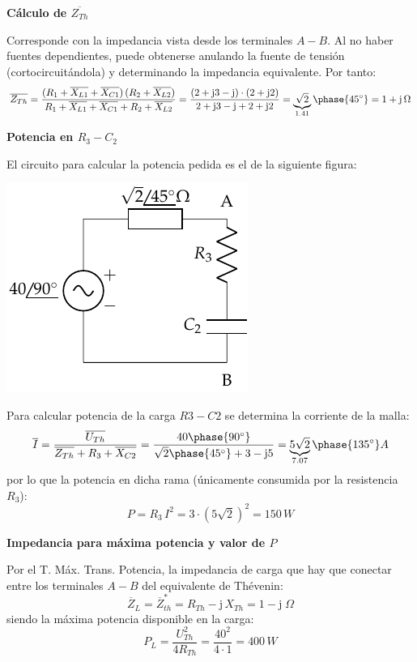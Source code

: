 \textbf{Cálculo de $\overline{Z_{Th}}$}
    
Corresponde con la impedancia vista desde los terminales $A-B$. Al no
haber fuentes dependientes, puede obtenerse anulando la fuente de
tensión (cortocircuitándola) y determinando la impedancia
equivalente. Por tanto:
\begin{equation*}
  \overline{Z_{Th}}=\dfrac{(R_1+\overline{X_{L1}}+\overline{X_{C1}})\,(R_2+\overline{X_{L2}})}{R_1+\overline{X_{L1}}+\overline{X_{C1}}+R_2+\overline{X_{L2}}}=\dfrac{(2+\mathrm{j} 3-\mathrm{j})\cdot(2+\mathrm{j} 2)}{2+\mathrm{j} 3-\mathrm{j}+2+\mathrm{j} 2}={\underbrace{\sqrt{2}}_{1.41}\phase{45^\circ}=1+\mathrm{j}\,\Omega}
\end{equation*}
    
\textbf{Potencia en $R_3-C_2$}
    
El circuito para calcular la potencia pedida es el de la siguiente
figura:

\begin{center}
  \includegraphics[width=0.3\linewidth]{figuras/BT2_19_th.pdf}
\end{center}

    
Para calcular potencia de la carga $R3-C2$ se determina la corriente
de la malla:
\begin{equation*}
  \overline{I}=\dfrac{\overline{U_{Th}}}{\overline{Z_{Th}}+R_3+\overline{X_{C2}}}=\dfrac{40\phase{90^\circ}}{\sqrt{2}\phase{45^\circ}+3-\mathrm{j}5}=\underbrace{5\sqrt{2}}_{7.07}\phase{135^\circ} A
\end{equation*}
por lo que la potencia en dicha rama (únicamente consumida por la
resistencia $R_3$):
\begin{equation*}
  P=R_3\,{I^2}=3\cdot (5\sqrt{2})^2={150\,W}
\end{equation*}
    
\textbf{Impedancia para máxima potencia y valor de $P$}
    
Por el T. Máx. Trans. Potencia, la impedancia de carga que hay que
conectar entre los terminales $A-B$ del equivalente de Thévenin:
\begin{equation*}
  {\overline{Z}_L = \overline{Z}_{th}^*=R_{Th}-\mathrm{j}\,X_{Th}}={1-\mathrm{j} \;\Omega}
\end{equation*}
siendo la máxima potencia disponible en la carga:
\begin{equation*}
  P_L = \dfrac{U_{Th}^2}{4 R_{Th}}=\dfrac{40^2}{4\cdot 1}={400\,W}
\end{equation*}

